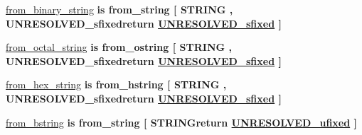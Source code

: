 \begin{DoxyCompactItemize}
\item 
\hyperlink{classfixed__pkg_a580a78b7c4cd63422b9a571293d8e018}{from\+\_\+binary\+\_\+string}  {\bfseries {\bfseries \textcolor{keywordflow}{is}\textcolor{vhdlchar}{ }\textcolor{vhdlchar}{from\+\_\+string}\textcolor{vhdlchar}{ }\textcolor{vhdlchar}{\mbox{[}}\textcolor{vhdlchar}{ }\textcolor{comment}{S\+T\+R\+I\+N\+G}\textcolor{vhdlchar}{ }\textcolor{vhdlchar}{,}\textcolor{vhdlchar}{ }\textcolor{vhdlchar}{U\+N\+R\+E\+S\+O\+L\+V\+E\+D\+\_\+sfixedreturn}\textcolor{vhdlchar}{ }{\bfseries \hyperlink{classfixed__pkg_aa723b28a027c3c0f9bca02d75e8df4d6}{U\+N\+R\+E\+S\+O\+L\+V\+E\+D\+\_\+sfixed}} \textcolor{vhdlchar}{ }\textcolor{vhdlchar}{\mbox{]}}\textcolor{vhdlchar}{ }}} {\bfseries \textcolor{vhdlchar}{ }} 
\item 
\hyperlink{classfixed__pkg_a2b916b59ea97f4c9f2ede4a0fec2c7fc}{from\+\_\+octal\+\_\+string}  {\bfseries {\bfseries \textcolor{keywordflow}{is}\textcolor{vhdlchar}{ }\textcolor{vhdlchar}{from\+\_\+ostring}\textcolor{vhdlchar}{ }\textcolor{vhdlchar}{\mbox{[}}\textcolor{vhdlchar}{ }\textcolor{comment}{S\+T\+R\+I\+N\+G}\textcolor{vhdlchar}{ }\textcolor{vhdlchar}{,}\textcolor{vhdlchar}{ }\textcolor{vhdlchar}{U\+N\+R\+E\+S\+O\+L\+V\+E\+D\+\_\+sfixedreturn}\textcolor{vhdlchar}{ }{\bfseries \hyperlink{classfixed__pkg_aa723b28a027c3c0f9bca02d75e8df4d6}{U\+N\+R\+E\+S\+O\+L\+V\+E\+D\+\_\+sfixed}} \textcolor{vhdlchar}{ }\textcolor{vhdlchar}{\mbox{]}}\textcolor{vhdlchar}{ }}} {\bfseries \textcolor{vhdlchar}{ }} 
\item 
\hyperlink{classfixed__pkg_a1f47bd651be4e4193398e4a1b0bc717d}{from\+\_\+hex\+\_\+string}  {\bfseries {\bfseries \textcolor{keywordflow}{is}\textcolor{vhdlchar}{ }\textcolor{vhdlchar}{from\+\_\+hstring}\textcolor{vhdlchar}{ }\textcolor{vhdlchar}{\mbox{[}}\textcolor{vhdlchar}{ }\textcolor{comment}{S\+T\+R\+I\+N\+G}\textcolor{vhdlchar}{ }\textcolor{vhdlchar}{,}\textcolor{vhdlchar}{ }\textcolor{vhdlchar}{U\+N\+R\+E\+S\+O\+L\+V\+E\+D\+\_\+sfixedreturn}\textcolor{vhdlchar}{ }{\bfseries \hyperlink{classfixed__pkg_aa723b28a027c3c0f9bca02d75e8df4d6}{U\+N\+R\+E\+S\+O\+L\+V\+E\+D\+\_\+sfixed}} \textcolor{vhdlchar}{ }\textcolor{vhdlchar}{\mbox{]}}\textcolor{vhdlchar}{ }}} {\bfseries \textcolor{vhdlchar}{ }} 
\item 
\hyperlink{classfixed__pkg_aef58272e8d4a4d71cf8e739793aaf721}{from\+\_\+bstring}  {\bfseries {\bfseries \textcolor{keywordflow}{is}\textcolor{vhdlchar}{ }\textcolor{vhdlchar}{from\+\_\+string}\textcolor{vhdlchar}{ }\textcolor{vhdlchar}{\mbox{[}}\textcolor{vhdlchar}{ }\textcolor{vhdlchar}{S\+T\+R\+I\+N\+Greturn}\textcolor{vhdlchar}{ }{\bfseries \hyperlink{classfixed__pkg_ae78bc2b36d22f6abeac163955e8a587d}{U\+N\+R\+E\+S\+O\+L\+V\+E\+D\+\_\+ufixed}} \textcolor{vhdlchar}{ }\textcolor{vhdlchar}{\mbox{]}}\textcolor{vhdlchar}{ }}} {\bfseries \textcolor{vhdlchar}{ }} 

\end{DoxyCompactItemize}

